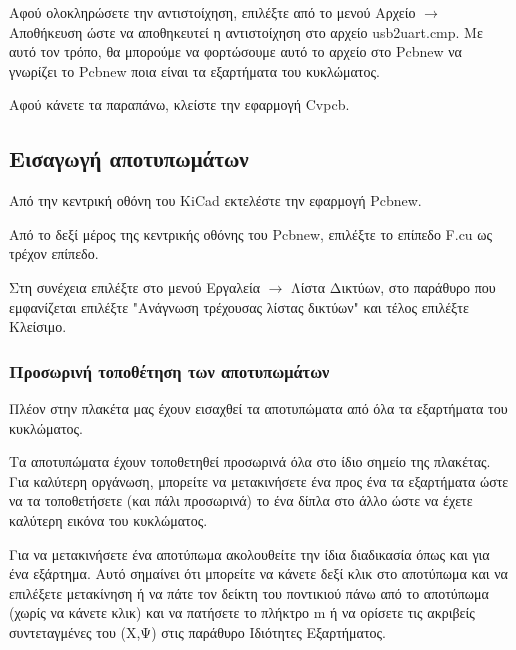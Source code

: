 \documentclass[a4paper]{article}
\begin{document}
\begin{figure}
  \begin{center}
    \label{fig:kicad-main}
  \end{center}
\end{figure}

Αφού ολοκληρώσετε την αντιστοίχηση, επιλέξτε από το μενού Αρχείο $\rightarrow$ Αποθήκευση ώστε να αποθηκευτεί η αντιστοίχηση στο αρχείο usb2uart.cmp. Με αυτό τον τρόπο, θα μπορούμε να φορτώσουμε αυτό το αρχείο στο \textenglish{Pcbnew} να γνωρίζει το \textenglish{Pcbnew} ποια είναι τα εξαρτήματα του κυκλώματος. 

Αφού κάνετε τα παραπάνω, κλείστε την εφαρμογή \textenglish{Cvpcb}.


\subsection{Εισαγωγή αποτυπωμάτων}
Από την κεντρική οθόνη του \textenglish{KiCad} εκτελέστε την εφαρμογή \textenglish{Pcbnew}. 

Από το δεξί μέρος της κεντρικής οθόνης του \textenglish{Pcbnew}, επιλέξτε το επίπεδο F.cu ως τρέχον επίπεδο.

Στη συνέχεια επιλέξτε στο μενού Εργαλεία $\rightarrow$ Λίστα Δικτύων, στο παράθυρο που εμφανίζεται επιλέξτε "Ανάγνωση τρέχουσας λίστας δικτύων" και τέλος επιλέξτε Κλείσιμο.

\subsubsection{Προσωρινή τοποθέτηση των αποτυπωμάτων}
Πλέον στην πλακέτα μας έχουν εισαχθεί τα αποτυπώματα από όλα τα εξαρτήματα του κυκλώματος. 

Τα αποτυπώματα έχουν τοποθετηθεί προσωρινά όλα στο ίδιο σημείο της πλακέτας. Για καλύτερη οργάνωση, μπορείτε να μετακινήσετε ένα προς ένα τα εξαρτήματα ώστε να τα τοποθετήσετε (και πάλι προσωρινά) το ένα δίπλα στο άλλο ώστε να έχετε καλύτερη εικόνα του κυκλώματος. 

Για να μετακινήσετε ένα αποτύπωμα ακολουθείτε την ίδια διαδικασία όπως και για ένα εξάρτημα. Αυτό σημαίνει ότι μπορείτε να κάνετε δεξί κλικ στο αποτύπωμα και να επιλέξετε μετακίνηση ή να πάτε τον δείκτη του ποντικιού πάνω από το αποτύπωμα (χωρίς να κάνετε κλικ) και να πατήσετε το πλήκτρο m ή να ορίσετε τις ακριβείς συντεταγμένες του (Χ,Ψ) στις παράθυρο Ιδιότητες Εξαρτήματος. 
\end{document}

